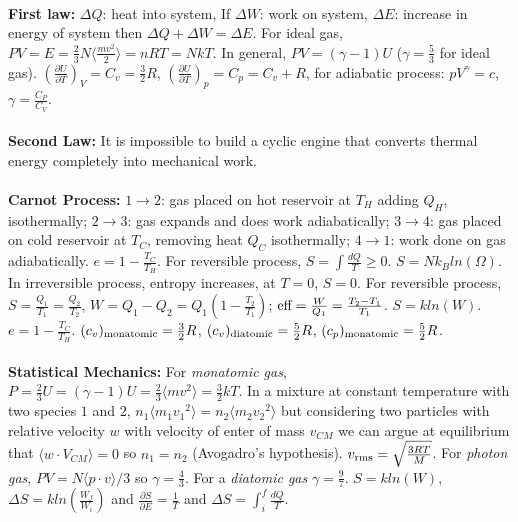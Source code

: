 \\
{\bf First law:} $\Delta Q$: heat into system,
If $\Delta W$: work on system,
$\Delta E$: increase in energy of system then
$\Delta Q + \Delta W= \Delta E $.  
For ideal gas, $PV= E= 
{\frac 2 3}N \langle {\frac {mv^2} 2} \rangle = nRT= NkT$.
In general, $PV= (\gamma - 1) U$ ($\gamma = {\frac 5 3}$ for ideal gas).
$ ({\frac {\partial U} {\partial T}})_V= C_v= {\frac 3 2} R$, $
({\frac {\partial U} {\partial T}})_p= C_p= C_v + R$, for adiabatic process: $pV^{\gamma}=c$,
$\gamma= {\frac {C_P} {C_V}}$.
\\
\\
{\bf Second Law:} It is impossible to build a cyclic engine that converts thermal
energy completely into mechanical work.  
\\
\\
{\bf Carnot Process:}
$1 \rightarrow 2$: gas placed on hot reservoir at $T_H$ adding $Q_H$, isothermally;
$2 \rightarrow 3$: gas expands and does work adiabatically;
$3 \rightarrow 4$: gas placed on cold reservoir at $T_C$, removing heat $Q_C$ isothermally;
$4 \rightarrow 1$: work done on gas adiabatically. $e= 1- {\frac {T_C} {T_H}}$.
For reversible process,
$S= \int {\frac {dQ} {T}} \geq 0$. $S= Nk_B ln(\Omega)$.  In irreversible process,
entropy increases, at $T=0$, $S=0$.  For reversible process, $S = {\frac {Q_1} {T_1}}
= {\frac {Q_2} {T_2}}$, $W= Q_1 - Q_2= Q_1 (1 - {\frac {T_2} {T_1}})$; 
$\textnormal{eff}={\frac W {Q_1}}= {\frac {T_2 - T_1} {T_1}}$. $S=k ln(W)$.
$e= 1- {\frac {T_C}{T_H}}$.
$(c_v)_{\textnormal{monatomic}}= {\frac 3 2} R$,
$(c_v)_{\textnormal{diatomic}}= {\frac 5 2} R$,
$(c_p)_{\textnormal{monatomic}}= {\frac 5 2} R$.
\\
\\
{\bf Statistical Mechanics:}
For \emph{monatomic gas}, 
$P= {\frac 2 3} U= (\gamma -1) U = {\frac 2 3} \langle m v^2 \rangle=
{\frac 3 2} kT$. In a mixture at constant temperature
with two species $1$ and $2$, 
$n_1 \langle m_1 {v_1}^2 \rangle = n_2 \langle m_2 {v_2}^2 \rangle$ 
but considering two particles with
relative velocity $w$ with  velocity of enter of mass $v_{CM}$ we can argue at equilibrium
that $\langle w \cdot V_{CM} \rangle = 0$ so $n_1=n_2$ (Avogadro's hypothesis).
$v_{\textnormal{rms}}= \sqrt{{\frac {3RT} {M}}}$.
For \emph{photon gas},
$PV= N \langle p \cdot v \rangle /3$ so $\gamma = {\frac 4 3}$.  
For a \emph{diatomic gas} $\gamma= {\frac 9 7}$.
$S= k ln(W)$, $\Delta S = k ln({\frac {W_f} {W_i}})$ and 
${\frac {\partial S} {\partial E}}= {\frac 1 T}$ and $\Delta S = \int_i^f {\frac {dQ} T}$.
